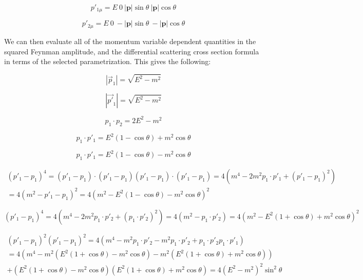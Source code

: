 \documentclass[a4]{article}
\begin{document}
    \begin{equation}
        p'_{1 \mu} = E \: 0 \: |\mathbf{p}| \sin \theta \: |\mathbf{p}| \cos \theta
    \end{equation}

    \begin{equation}
        p'_{2 \mu} = E \: 0 \: - |\mathbf{p}| \sin \theta \: - |\mathbf{p}| \cos \theta
    \end{equation}

    We can then evaluate all of the momentum variable dependent quantities in the squared Feynman amplitude, and the differential scattering cross section formula in terms of the selected parametrization. This gives the following:

    \begin{equation}
        |\vec{p}_1| = \sqrt{E^2 - m^2}
    \end{equation}

    \begin{equation}
        |\vec{p'}_1| = \sqrt{E^2 - m^2}
    \end{equation}

    \begin{equation}
        p_1 \cdot p_2 = 2 E^2 - m^2
    \end{equation}

    \begin{equation}
        p_1 \cdot p'_1 = E^2 (1 - \cos \theta) + m^2 \cos \theta
    \end{equation}

    \begin{equation}
        p_1 \cdot p'_1 = E^2 (1 - \cos \theta) - m^2 \cos \theta
    \end{equation}

    \begin{eqnarray}
        (p'_1 - p_1)^4 = (p'_1 - p_1) \cdot (p'_1 - p_1) (p'_1 - p_1) \cdot (p'_1 - p_1) = 4 (m^4 - 2 m^2 p_1 \cdot p'_1 + (p'_1 - p_1)^2) \\
        = 4 (m^2 - p'_1 - p_1)^2 = 4 (m^2 - E^2 (1 - \cos \theta) - m^2 \cos \theta)^2
    \end{eqnarray}

    \begin{equation}
        (p'_1 - p_1)^4 = 4 (m^4 - 2 m^2 p_1 \cdot p'_2 + (p_1 \cdot p'_2)^2) = 4 (m^2 - p_1 \cdot p'_2) = 4 (m^2 - E^2 (1 + \cos \theta) + m^2 \cos \theta)^2
    \end{equation}

    \begin{eqnarray}
        (p'_1 - p_1)^2 (p'_1 - p_1)^2 = 4 (m^4 - m^2 p_1 \cdot p'_2 - m^2 p_1 \cdot p'_2 + p_1 \cdot p'_2 p_1 \cdot p'_1) \\
        = 4 (m^4 - m^2 (E^2 (1 + \cos \theta) - m^2 \cos \theta) - m^2 (E^2 (1 + \cos \theta) + m^2 \cos \theta) ) \\
        + (E^2 (1 + \cos \theta) - m^2 \cos \theta) (E^2 (1 + \cos \theta) + m^2 \cos \theta) = 4 (E^2 - m^2)^2 \sin^2 \theta 
    \end{eqnarray}
\end{document}
